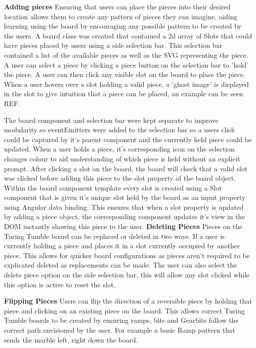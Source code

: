 \documentclass{l4proj}
\begin{document}
\textbf{Adding pieces}
Ensuring that users can place the pieces into their desired location allows them to create any pattern of pieces they can imagine, aiding learning using the board by encouraging any possible pattern to be created by the users. A board class was created that contained a 2d array of Slots that could have pieces placed by users using a side selection bar. This selection bar contained a list of the available pieces as well as the SVG representing the piece. A user can select a piece by clicking a piece button on the selection bar to 'hold' the piece. A user can then click any visible slot on the board to place the piece. When a user hovers over a slot holding a valid piece, a 'ghost image' is displayed in the slot to give intuition that a piece can be placed, an example can be seen REF. 

The board component and selection bar were kept separate to improve modularity so eventEmitters were added to the selection bar so a users click could be captured by it's parent component and the currently held piece could be updated. When a user holds a piece, it's corresponding icon on the selection changes colour to aid understanding of which piece is held without an explicit prompt. After clicking a slot on the board, the board will check that a valid slot was clicked before adding this piece to the slot property of the board object. Within the board component template every slot is created using a Slot component that is given it's unique slot held by the board as an input property using Angular data binding. This ensures that when a slot property is updated by adding a piece object, the corresponding component updates it's view in the DOM instantly showing this piece to the user.
\textbf{Deleting Pieces}
Pieces on the Turing Tumble board can be replaced or deleted in two ways. If a user is currently holding a piece and places it in a slot currently occupied by another piece. This allows for quicker board configurations as pieces aren't required to be explicated deleted as replacements can be made. The user can also select the delete piece option on the side selection bar, this will allow any slot clicked while this option is active to reset the slot.

\textbf{Flipping Pieces}
Users can flip the direction of a reversible piece by holding that piece and clicking on an existing piece on the board. This allows correct Turing Tumble boards to be created by ensuring ramps, bits and Gearbits follow the correct path envisioned by the user. For example a basic Ramp pattern that sends the marble left, right down the board. 
\end{document}
